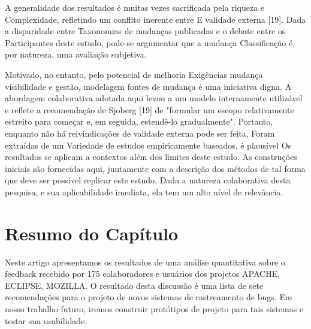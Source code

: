 A generalidade dos resultados é muitas vezes sacrificada pela riqueza e
Complexidade, refletindo um conflito inerente entre E validade externa [19].
Dada a disparidade entre Taxonomias de mudanças publicadas e o debate entre os
Participantes deste estudo, pode-se argumentar que a mudança Classificação é,
por natureza, uma avaliação subjetiva.

Motivado, no entanto, pelo potencial de melhoria Exigências mudança visibilidade
e gestão, modelagem fontes de mudança é uma iniciativa digna. A abordagem
colaborativa adotada aqui levou a um modelo internamente utilizável e reflete a
recomendação de Sjoberg [19] de "formular um escopo relativamente estreito para
começar e, em seguida, estendê-lo gradualmente". Portanto, enquanto não há
reivindicações de validade externa pode ser feita, Foram extraídas de um
Variedade de estudos empiricamente baseados, é plausível Os resultados se
aplicam a contextos além dos limites deste estudo. As construções iniciais são
fornecidas aqui, juntamente com a descrição dos métodos de tal forma que deve
ser possível replicar este estudo. Dada a natureza colaborativa desta pesquisa,
e sua aplicabilidade imediata, ela tem um alto nível de relevância.

\section{Resumo do Capítulo}
\label{sec:resumo_do_capitulo}
Neste artigo apresentamos os resultados de uma análise quantitativa sobre o
feedback recebido por 175 colaboradores e usuários dos projetos APACHE, ECLIPSE,
MOZILLA. O resultado desta discussão é uma lista de sete recomendações para o
projeto de novos sistemas de rastreamento de bugs. Em nosso trabalho futuro,
iremos construir protótipos de projeto para tais sistemas e testar sua
usabilidade.